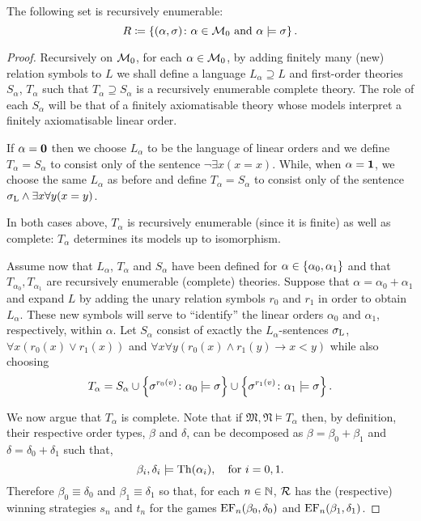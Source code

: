 \begin{lem}\label{lem:rescat}
	The following set is recursively enumerable:
	\begin{equation}
		R\coloneqq\left\lbrace (\alpha,\sigma)\colon \alpha\in\mathcal{M}_0\text{ and }\alpha\models\sigma \right\rbrace.
	\end{equation}
\end{lem}
\begin{proof}
	Recursively on $\mathcal{M}_0$, for each $\alpha\in\mathcal{M}_0$, by adding finitely many (new) relation symbols to $L$ we shall define a language $L_\alpha\supseteq L$ and first-order theories $S_\alpha$, $T_\alpha$ such that $T_\alpha\supseteq S_\alpha$ is a recursively enumerable complete theory.  The role of each $S_\alpha$ will be that of a finitely axiomatisable theory whose models interpret a finitely axiomatisable linear order.

	If $\alpha=\mathbf{0}$ then we choose $L_\alpha$ to be the language of linear orders and we define $T_\alpha=S_\alpha$ to consist only of the sentence $\neg\exists x(x=x)$.  While, when $\alpha=\mathbf{1}$, we choose the same $L_\alpha$ as before and define $T_\alpha=S_\alpha$ to consist only of the sentence $\sigma_{\mathrm{L}}\wedge\exists x\forall y(x=y)$.

	In both cases above, $T_\alpha$ is recursively enumerable (since it is finite) as well as complete:  $T_\alpha$ determines its models up to isomorphism.

	Assume now that $L_\alpha$, $T_\alpha$ and $S_\alpha$ have been defined for $\alpha\in\left\lbrace \alpha_0,\alpha_1\right\rbrace$ and that $T_{\alpha_0},T_{\alpha_1}$ are recursively enumerable (complete) theories.  Suppose that $\alpha=\alpha_0+\alpha_1$ and expand $L$ by adding the unary relation symbols $r_0$ and $r_1$ in order to obtain $L_\alpha$.  These new symbols will serve to ``identify'' the linear orders $\alpha_0$ and $\alpha_1$, respectively, within $\alpha$.  Let $S_\alpha$ consist of exactly the $L_\alpha$-sentences $\sigma_{\mathrm{L}}$, $\forall x(r_0(x)\vee r_1(x))$ and $\forall x\forall y(r_0(x)\wedge r_1(y)\rightarrow x<y)$ while also choosing
	\begin{equation}
		T_\alpha=S_\alpha\cup\left\lbrace \sigma^{r_0(v)}\colon \alpha_0\models\sigma \right\rbrace\cup\left\lbrace \sigma^{r_1(v)}\colon \alpha_1\models\sigma \right\rbrace.
	\end{equation}

	We now argue that $T_\alpha$ is complete.  Note that if $\mathfrak{M},\mathfrak{N}\models T_\alpha$ then, by definition, their respective order types, $\beta$ and $\delta$, can be decomposed as $\beta=\beta_0+\beta_1$ and $\delta=\delta_0+\delta_1$ such that,
	\begin{equation}
		\beta_i,\delta_i\models\operatorname{Th}(\alpha_i), \quad\text{for }i=0,1.
	\end{equation}
	Therefore $\beta_0\equiv\delta_0$ and $\beta_1\equiv\delta_1$ so that, for each $n\in\mathbb{N}$, $\mathcal{R}$ has the (respective) winning strategies $s_n$ and $t_n$ for the games $\operatorname{EF}_n(\beta_0,\delta_0)$ and $\operatorname{EF}_n(\beta_1,\delta_1)$.


\end{proof}
